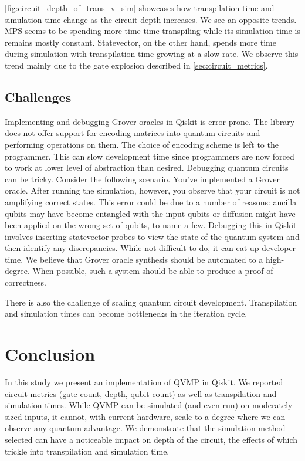 \documentclass[11pt]{article}
\theoremstyle{definition}
\theoremstyle{remark}
\begin{document}
\cref{fig:circuit_depth_of_trans_v_sim} showcases how transpilation
time and simulation time change as the circuit depth increases. We see an
opposite trends. MPS seems to be spending more time time transpiling while its
simulation time is remains mostly constant. Statevector, on the other hand,
spends more time during simulation with transpilation time growing at a slow
rate. We observe this trend mainly due to the gate explosion described in
\cref{sec:circuit_metrics}.

\subsection{Challenges}

Implementing and debugging Grover oracles in Qiskit is error-prone. The library
does not offer support for encoding matrices into quantum circuits and
performing operations on them.  The choice of encoding scheme is left to the
programmer. This can slow development time since programmers are now forced to
work at lower level of abstraction than desired. Debugging quantum circuits can
be tricky. Consider the following scenario. You've implemented a Grover oracle.
After running the simulation, however, you observe that your circuit is not
amplifying correct states. This error could be due to a number of reasons:
ancilla qubits may have become entangled with the input qubits or diffusion
might have been applied on the wrong set of qubits, to name a few. Debugging
this in Qiskit involves inserting statevector probes to view the state of the
quantum system and then identify any discrepancies.  While not difficult to do,
it can eat up developer time. We believe that Grover oracle synthesis should be
automated to a high-degree. When possible, such a system should be able to
produce a proof of correctness.

There is also the challenge of scaling quantum circuit development.
Transpilation and simulation times can become bottlenecks in the iteration
cycle.

\section{Conclusion}

In this study we present an implementation of QVMP in Qiskit. We reported
circuit metrics (gate count, depth, qubit count) as well as transpilation and
simulation times. While QVMP can be simulated (and even run) on moderately-sized
inputs, it cannot, with current hardware, scale to a degree where we can
observe any quantum advantage. We demonstrate that the simulation method
selected can have a noticeable impact on depth of the circuit, the effects of
which trickle into transpilation and simulation time.
\end{document}
